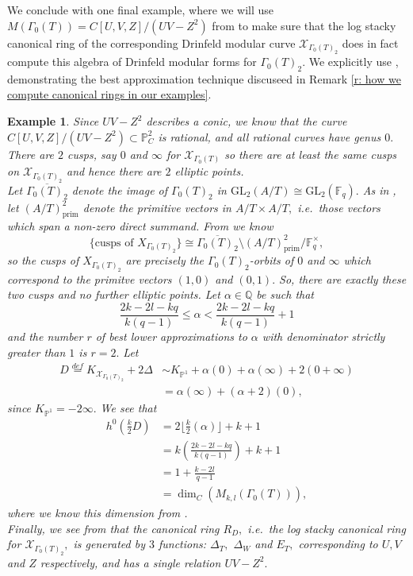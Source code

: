 \documentclass[11pt]{amsart}
\newtheorem{example}[theorem]{Example}
\theoremstyle{definition}
\numberwithin{equation}{section}
\newcommand{\GL}{\mathrm{GL}} 	%
\newcommand{\sX}{\mathscr{X}}		%
\newcommand{\bbF}{\mathbb{F}}		%
\newcommand{\bbP}{\mathbb{P}}		%
\newcommand{\bbQ}{\mathbb{Q}}		%
\begin{document}
We conclude with one final example, where we will use $M(\Gamma_0(T))=C[U,V,Z]/(UV-Z^2)$ from \cite[Theorem $4.4$]{Dalal-Kumar-Gamma_0(T)-structure} to make sure that the log stacky canonical ring of the corresponding Drinfeld modular curve $\sX_{\Gamma_0(T)_2}$ does in fact compute this algebra of Drinfeld modular forms for $\Gamma_0(T)_2.$ We explicitly use \cite[Theorem $6$]{ODorney-canonical-rings-Q-divisors-on-P1}, demonstrating the best approximation technique discuseed in Remark \ref{r: how we compute canonical rings in our examples}.
\begin{example}
	Since $UV-Z^2$ describes a conic, we know that the curve $C[U,V,Z]/(UV-Z^2)\subset\bbP^2_C$ is rational, and all rational curves have genus $0.$ There are $2$ cusps, say $0$ and $\infty$ for $\sX_{\Gamma_0(T)}$ so there are at least the same cusps on $\sX_{\Gamma_0(T)_2}$ and hence there are $2$ elliptic points.\\ 
	
	Let $\overline{\Gamma_0(T)_2}$ denote the image of $\Gamma_0(T)_2$ in $\GL_2(A/T)\cong \GL_2(\bbF_q).$ As in \cite[Section $3$]{Gekeler-Invariants}, let $(A/T)^2_{\text{prim}}$ denote the primitive vectors in $A/T\times A/T,$ i.e.\ those vectors which span a non-zero direct summand. From \cite[Section $3$]{Gekeler-Invariants} we know 
	\[\{\text{cusps of }X_{\Gamma_0(T)_2}\}\cong \overline{\Gamma_0(T)_2}\setminus (A/T)^2_{\text{prim}}/\bbF_q^{\times},\] so the cusps of $X_{\Gamma_0(T)_2}$ are precisely the $\Gamma_0(T)_2$-orbits of $0$ and $\infty$ which correspond to the primitve vectors $(1,0)$ and $(0,1).$ So, there are exactly these two cusps and no further elliptic points. Let $\alpha\in \bbQ$ be such that \[\frac{2k-2l-kq}{k(q-1)}\leq \alpha<\frac{2k-2l-kq}{k(q-1)}+1\] and the number $r$ of best lower approximations to $\alpha$ with denominator strictly greater than $1$ is $r=2.$ Let
	\begin{align*}
		D\overset{def}{=}K_{\sX_{\Gamma_0(T)_2}}+2\Delta&\sim K_{\bbP^1}+\alpha(0)+\alpha(\infty)+2(0+\infty)\\
		&=\alpha(\infty)+(\alpha+2)(0),
	\end{align*}
	since $K_{\bbP^1}= -2\infty.$ We see that 
	\begin{align*}
		h^0\left(\frac{k}{2}D\right)&=2\Big\lfloor\frac{k}{2}(\alpha)\Big\rfloor+k+1\\
		&=k\left(\frac{2k-2l-kq}{k(q-1)}\right)+k+1\\
		&=1+\frac{k-2l}{q-1}\\
		&=\dim_C(M_{k,l}(\Gamma_0(T))),
	\end{align*}
	where we know this dimension from \cite[Proposition $4.1$]{Dalal-Kumar-Gamma_0(T)-structure}.\\
	
	Finally, we see from \cite[Theorem $6$]{ODorney-canonical-rings-Q-divisors-on-P1} that the canonical ring $R_D,$ i.e.\ the log stacky canonical ring for $\sX_{\Gamma_0(T)_2},$ is generated by $3$ functions: $\Delta_T,$ $\Delta_W$ and $E_T,$ corresponding to $U,V$ and $Z$ respectively, and has a single relation $UV-Z^2.$ 
\end{example}


\newpage
\end{document}
